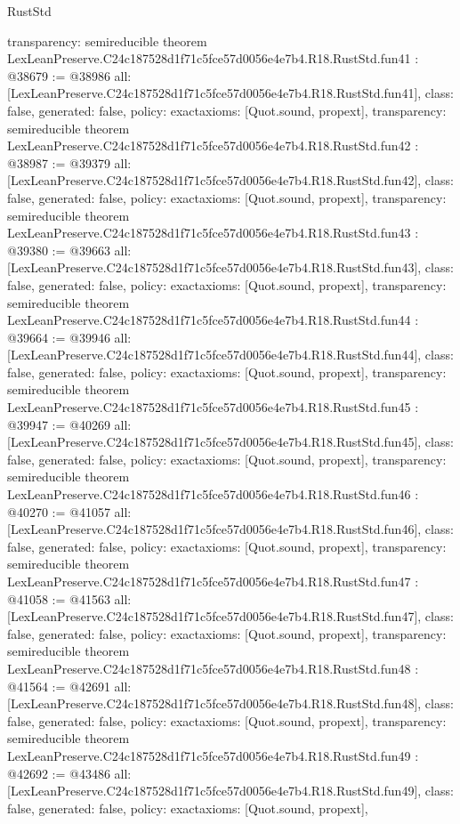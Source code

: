 \begin{lexlean}{RustStd}
\begin{coremodule}
{  transparency: semireducible
}
theorem LexLeanPreserve.C24c187528d1f71c5fce57d0056e4e7b4.R18.RustStd.fun41 : @38679 := @38986 {
  all: [LexLeanPreserve.C24c187528d1f71c5fce57d0056e4e7b4.R18.RustStd.fun41],
  class: false,
  generated: false,
  policy: exact{axioms: [Quot.sound, propext]},
  transparency: semireducible
}
theorem LexLeanPreserve.C24c187528d1f71c5fce57d0056e4e7b4.R18.RustStd.fun42 : @38987 := @39379 {
  all: [LexLeanPreserve.C24c187528d1f71c5fce57d0056e4e7b4.R18.RustStd.fun42],
  class: false,
  generated: false,
  policy: exact{axioms: [Quot.sound, propext]},
  transparency: semireducible
}
theorem LexLeanPreserve.C24c187528d1f71c5fce57d0056e4e7b4.R18.RustStd.fun43 : @39380 := @39663 {
  all: [LexLeanPreserve.C24c187528d1f71c5fce57d0056e4e7b4.R18.RustStd.fun43],
  class: false,
  generated: false,
  policy: exact{axioms: [Quot.sound, propext]},
  transparency: semireducible
}
theorem LexLeanPreserve.C24c187528d1f71c5fce57d0056e4e7b4.R18.RustStd.fun44 : @39664 := @39946 {
  all: [LexLeanPreserve.C24c187528d1f71c5fce57d0056e4e7b4.R18.RustStd.fun44],
  class: false,
  generated: false,
  policy: exact{axioms: [Quot.sound, propext]},
  transparency: semireducible
}
theorem LexLeanPreserve.C24c187528d1f71c5fce57d0056e4e7b4.R18.RustStd.fun45 : @39947 := @40269 {
  all: [LexLeanPreserve.C24c187528d1f71c5fce57d0056e4e7b4.R18.RustStd.fun45],
  class: false,
  generated: false,
  policy: exact{axioms: [Quot.sound, propext]},
  transparency: semireducible
}
theorem LexLeanPreserve.C24c187528d1f71c5fce57d0056e4e7b4.R18.RustStd.fun46 : @40270 := @41057 {
  all: [LexLeanPreserve.C24c187528d1f71c5fce57d0056e4e7b4.R18.RustStd.fun46],
  class: false,
  generated: false,
  policy: exact{axioms: [Quot.sound, propext]},
  transparency: semireducible
}
theorem LexLeanPreserve.C24c187528d1f71c5fce57d0056e4e7b4.R18.RustStd.fun47 : @41058 := @41563 {
  all: [LexLeanPreserve.C24c187528d1f71c5fce57d0056e4e7b4.R18.RustStd.fun47],
  class: false,
  generated: false,
  policy: exact{axioms: [Quot.sound, propext]},
  transparency: semireducible
}
theorem LexLeanPreserve.C24c187528d1f71c5fce57d0056e4e7b4.R18.RustStd.fun48 : @41564 := @42691 {
  all: [LexLeanPreserve.C24c187528d1f71c5fce57d0056e4e7b4.R18.RustStd.fun48],
  class: false,
  generated: false,
  policy: exact{axioms: [Quot.sound, propext]},
  transparency: semireducible
}
theorem LexLeanPreserve.C24c187528d1f71c5fce57d0056e4e7b4.R18.RustStd.fun49 : @42692 := @43486 {
  all: [LexLeanPreserve.C24c187528d1f71c5fce57d0056e4e7b4.R18.RustStd.fun49],
  class: false,
  generated: false,
  policy: exact{axioms: [Quot.sound, propext]},
}
\end{coremodule}
\end{lexlean}
